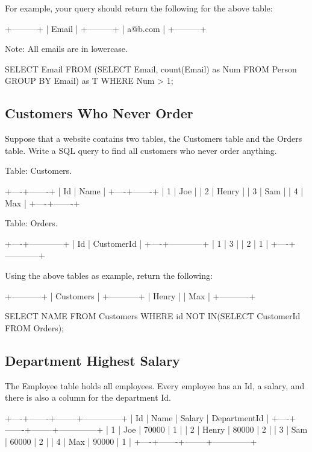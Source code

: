 For example, your query should return the following for the above table:
\begin{Code}
	+---------+
	| Email   |
	+---------+
	| a@b.com |
	+---------+
\end{Code}

Note: All emails are in lowercase.

\begin{Code}
	SELECT Email FROM (SELECT Email, count(Email) as Num  FROM Person GROUP BY Email) as T WHERE Num > 1;
\end{Code}

\subsection{Customers Who Never Order}
Suppose that a website contains two tables, the Customers table and the Orders table. Write a SQL query to find all customers who never order anything.

Table: Customers.
\begin{Code}
	+----+-------+
	| Id | Name  |
	+----+-------+
	| 1  | Joe   |
	| 2  | Henry |
	| 3  | Sam   |
	| 4  | Max   |
	+----+-------+
\end{Code}

Table: Orders.
\begin{Code}
	+----+------------+
	| Id | CustomerId |
	+----+------------+
	| 1  | 3          |
	| 2  | 1          |
	+----+------------+
\end{Code}

Using the above tables as example, return the following:
\begin{Code}
	+-----------+
	| Customers |
	+-----------+
	| Henry     |
	| Max       |
	+-----------+
\end{Code}

\begin{Code}
	SELECT NAME FROM Customers WHERE id NOT IN(SELECT CustomerId FROM Orders);
\end{Code}

\subsection{Department Highest Salary}
The Employee table holds all employees. Every employee has an Id, a salary, and there is also a column for the department Id.
\begin{Code}
	+----+-------+--------+--------------+
	| Id | Name  | Salary | DepartmentId |
	+----+-------+--------+--------------+
	| 1  | Joe   | 70000  | 1            |
	| 2  | Henry | 80000  | 2            |
	| 3  | Sam   | 60000  | 2            |
	| 4  | Max   | 90000  | 1            |
	+----+-------+--------+--------------+
\end{Code}


